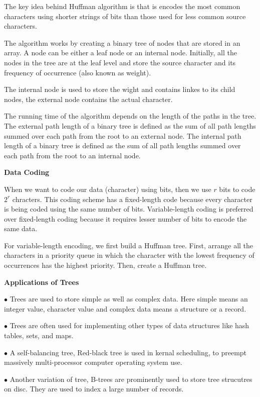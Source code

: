 \vskip 1mm
The key idea behind Huffman algorithm is that is encodes the most common characters using shorter strings of bits than those used for less common source characters.

\vskip 1mm
The algorithm works by creating a binary tree of nodes that are stored in an array. A node can be either a leaf node or an internal node. Initially, all the nodes in the tree are at the leaf level and store the source character and its frequency of occurrence (also known as weight).

\vskip 1mm
The internal node is used to store the wight and contains linkes to its child nodes, the external node contains the actual character.

\vskip 1mm
The running time of the algorithm depends on the length of the paths in the tree. The external path length  of a binary tree is defined as the sum of all path lengths summed over each path from the root to an external node. The internal path length of a binary tree is defined as the sum of all path lengths summed over each path from the root to an internal node.

\vskip 3mm
{\bf Data Coding}

\vskip 1mm
When we want to code our data (character) using bits, then we use $r$ bits to code $2^r$ chracters. This coding scheme has a fixed-length code because every character is being coded using the same number of bits. Variable-length coding is preferred over fixed-length coding because it requires lesser number of bits to encode the same data.

\vskip 1mm
For variable-length encoding, we first build a Huffman tree. First, arrange all the characters in a priority queue in which the character with the lowest frequency of occurrences has the highest priority. Then, create a Huffman tree.

\filbreak
\vskip 1cm
{\bf Applications of Trees}

\vskip 3mm
\qquad$\bullet$ Trees are used to store simple as well as complex data. Here simple means an integer value, character value and complex data means a structure or a record.

\vskip 3mm
\qquad$\bullet$ Trees are often used for implementing other types of data structures like hash tables, sets, and maps.

\vskip 3mm
\qquad$\bullet$ A self-balancing tree, Red-black tree is used in kernal scheduling, to preempt massively multi-processor computer operating system use.

\vskip 3mm
\qquad$\bullet$ Another variation of tree, B-trees are prominently used to store tree strucutres on disc. They are used to index a large number of records.


